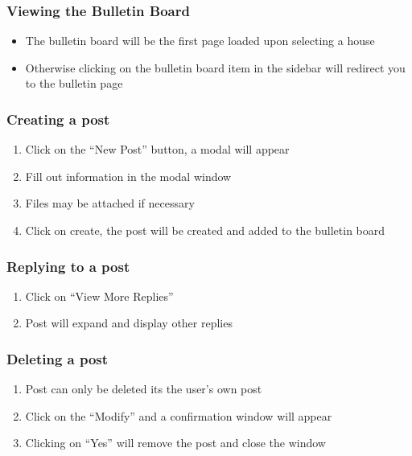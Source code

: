 \documentclass[12pt]{article}
\begin{document}
    \subsubsection{Viewing the Bulletin Board}
    \begin{itemize}
        \item The bulletin board will be the first page loaded upon selecting a house
        \item Otherwise clicking on the bulletin board item in the sidebar will redirect you to the bulletin page
    \end{itemize}

    \subsubsection{Creating a post}
    \begin{enumerate}
        \item Click on the ``New Post'' button, a modal will appear
        \item Fill out information in the modal window
        \item Files may be attached if necessary
        \item Click on create, the post will be created and added to the bulletin board
    \end{enumerate}

    \subsubsection{Replying to a post}
    \begin{enumerate}
        \item Click on ``View More Replies''
        \item Post will expand and display other replies
    \end{enumerate}

    \subsubsection{Deleting a post}
    \begin{enumerate}
        \item Post can only be deleted its the user's own post
        \item Click on the ``Modify'' and a confirmation window will appear
        \item Clicking on ``Yes'' will remove the post and close the window
    \end{enumerate}
\end{document}
